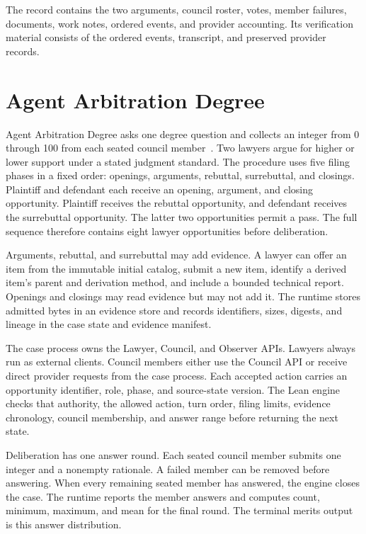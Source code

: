 \documentclass[11pt]{article}
\begin{document}
The record contains the two arguments, council roster, votes, member failures, documents, work notes, ordered events, and provider accounting.  Its verification material consists of the ordered events, transcript, and preserved provider records.

\section{Agent Arbitration Degree}

Agent Arbitration Degree asks one degree question and collects an integer from 0 through 100 from each seated council member~\cite{manuals}.  Two lawyers argue for higher or lower support under a stated judgment standard.  The procedure uses five filing phases in a fixed order: openings, arguments, rebuttal, surrebuttal, and closings.  Plaintiff and defendant each receive an opening, argument, and closing opportunity.  Plaintiff receives the rebuttal opportunity, and defendant receives the surrebuttal opportunity.  The latter two opportunities permit a pass.  The full sequence therefore contains eight lawyer opportunities before deliberation.

Arguments, rebuttal, and surrebuttal may add evidence.  A lawyer can offer an item from the immutable initial catalog, submit a new item, identify a derived item's parent and derivation method, and include a bounded technical report.  Openings and closings may read evidence but may not add it.  The runtime stores admitted bytes in an evidence store and records identifiers, sizes, digests, and lineage in the case state and evidence manifest.

The case process owns the Lawyer, Council, and Observer APIs.  Lawyers always run as external clients.  Council members either use the Council API or receive direct provider requests from the case process.  Each accepted action carries an opportunity identifier, role, phase, and source-state version.  The Lean engine checks that authority, the allowed action, turn order, filing limits, evidence chronology, council membership, and answer range before returning the next state.

Deliberation has one answer round.  Each seated council member submits one integer and a nonempty rationale.  A failed member can be removed before answering.  When every remaining seated member has answered, the engine closes the case.  The runtime reports the member answers and computes count, minimum, maximum, and mean for the final round.  The terminal merits output is this answer distribution.
\end{document}
